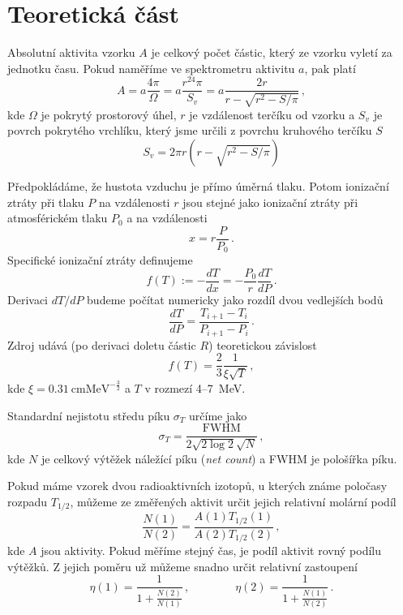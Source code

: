 \section*{Teoretická část}
Absolutní aktivita vzorku $A$ je celkový počet částic, který ze vzorku vyletí za jednotku času.
Pokud naměříme ve spektrometru aktivitu $a$, pak platí
\begin{equation}\label{aktivita}
A=a \frac{4\pi}{\Omega} = a \frac{r^24\pi}{S_v} = a \frac{2r}{r-\sqrt{r^2-S/\pi}}\,,
\end{equation}
kde $\Omega$ je pokrytý prostorový úhel, $r$ je vzdálenost terčíku od vzorku a $S_v$ je povrch pokrytého vrchlíku, který jsme určili z povrchu kruhového terčíku $S$
\begin{equation}
S_v=2\pi r (r-\sqrt{r^2-S/\pi})
\end{equation}


Předpokládáme, že hustota vzduchu je přímo úměrná tlaku. Potom ionizační ztráty při tlaku $P$ na vzdálenosti $r$ jsou stejné jako ionizační ztráty při atmosférickém tlaku $P_0$ a na vzdálenosti
\begin{equation}
x=r\frac{P}{P_0} \,.
\end{equation}
Specifické ionizační ztráty definujeme \cite{skripta}
\begin{equation} \label{f}
f(T):=-\frac{dT}{dx}=-\frac{P_0}{r}\frac{dT}{dP} \,.
\end{equation}
Derivaci $dT/dP$ budeme počítat numericky jako rozdíl dvou vedlejších bodů
\begin{equation} \label{dTdP}
\frac{dT}{dP}=\frac{T_{i+1}-T_i}{P_{i+1}-P_{i}} \,.
\end{equation}
Zdroj \cite{skripta} udává (po derivaci doletu částic $R$) teoretickou závislost
\begin{equation} \label{teoreticka}
f(T)=\frac{2}{3} \frac{1}{\xi \sqrt{T}} \,,
\end{equation}
kde $\xi=\SI{0.31}{\cm\MeV}^{-\frac{3}{2}}$ a $T$ v rozmezí \num{4}--\SI{7}{\MeV}.


Standardní nejistotu středu píku $\sigma_T$ určíme jako
\begin{equation}\label{chyba}
\sigma_T=\frac{\text{FWHM}}{2\sqrt{2\log 2}\sqrt{N}} \,,
\end{equation}
kde $N$ je celkový výtěžek náležící píku (\emph{net count}) a FWHM je pološířka píku.


Pokud máme vzorek dvou radioaktivních izotopů, u kterých známe poločasy rozpadu $T_{1/2}$, můžeme ze změřených aktivit určit jejich relativní molární podíl
\begin{equation} \label{Pu}
\frac{N(1)}{N(2)}=\frac{A(1) T_{1/2}(1)}{A(2) T_{1/2}(2)} \,,
\end{equation}
kde $A$ jsou aktivity. Pokud měříme stejný čas, je podíl aktivit rovný podílu výtěžků. Z jejich poměru už můžeme snadno určit relativní zastoupení
\begin{equation} 
\eta(1)=\frac{1}{1+\frac{N(2)}{N(1)}} \,, \qquad \qquad \eta(2)=\frac{1}{1+\frac{N(1)}{N(2)}} \,.
\end{equation}
